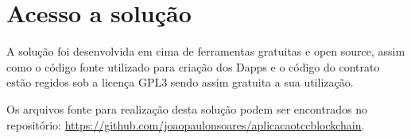\section{Acesso a solução}

A solução foi desenvolvida em cima de ferramentas gratuitas e open source, assim como o código fonte utilizado para criação dos Dapps e o código do contrato estão regidos sob a licença GPL3 sendo assim gratuita a sua utilização.

Os arquivos fonte para realização desta solução podem ser encontrados no repositório:  \url{https://github.com/joaopaulonsoares/aplicacaotccblockchain}.

